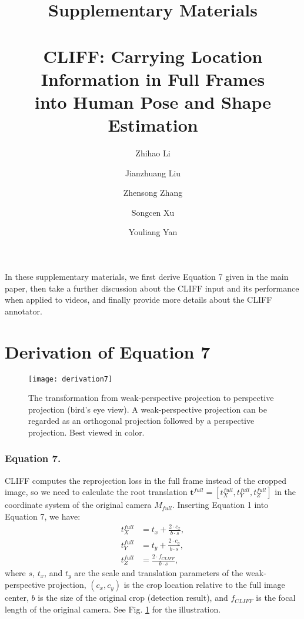 \documentclass[runningheads]{llncs}
\begin{document}
\title{Supplementary Materials \\
	\scriptsize ~ \\
	\normalsize CLIFF: Carrying Location Information in Full Frames \\
	into Human Pose and Shape Estimation}



\author{
Zhihao Li \and
Jianzhuang Liu \and
Zhensong Zhang \and
Songcen Xu \and
Youliang Yan
}



\maketitle

In these supplementary materials, we first derive Equation 7 given in the main paper, then take a further discussion about the CLIFF input and its performance when applied to videos, and finally provide more details about the CLIFF annotator.

\section{Derivation of Equation 7}

\begin{figure}[t]
	\centering
	\texttt{[image: derivation7]}
	\caption {The transformation from weak-perspective projection to perspective projection (bird's eye view). A weak-perspective projection can be regarded as an orthogonal projection followed by a perspective projection. Best viewed in color.}
	\label{fig:derivation}
\end{figure}

\subsubsection{Equation 7.}
CLIFF computes the reprojection loss in the full frame instead of the cropped image, so we need to calculate the root translation $\mathbf{t}^{full}=[t^{full}_X, t^{full}_Y, t^{full}_Z]$ in the coordinate system of the original camera $M_{full}$.
Inserting Equation 1 into Equation 7, we have:
\begin{equation}\tag{7.1}\begin{aligned}
	\label{eq:convert_full}
	t_X^{full} & = t_x + \frac{2 \cdot c_x}{b \cdot s}, \\
	t_Y^{full} & = t_y + \frac{2 \cdot c_y}{b \cdot s}, \\
	t_Z^{full} & = \frac{2 \cdot f_{CLIFF}}{b \cdot s},
\end{aligned}\end{equation}
where $s$, $t_x$, and $t_y$ are the scale and translation parameters of the weak-perspective projection, $(c_x, c_y)$ is the crop location relative to the full image center, $b$ is the size of the original crop (detection result), and $f_{CLIFF}$ is the focal length of the original camera.
See Fig. \ref{fig:derivation} for the illustration.
\end{document}

